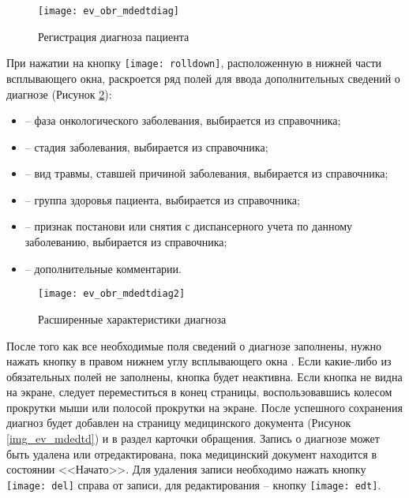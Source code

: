{\begin{enumerate}
  \begin{figure}[ht!]\centering
    \texttt{[image: ev\_obr\_mdedtdiag]}
    \caption{Регистрация диагноза пациента}
    \label{img_ev_obr_mdedtdiag}
  \end{figure}
  
 При нажатии на кнопку \texttt{[image: rolldown]}, расположенную в нижней части всплывающего окна, раскроется ряд полей для ввода дополнительных сведений о диагнозе (Рисунок \ref{img_ev_obr_mdedtdiag2}):
 \begin{itemize}
  \item {} -- фаза онкологического заболевания, выбирается из справочника;
  \item {} -- стадия заболевания, выбирается из справочника;
  \item {} -- вид травмы, ставшей причиной заболевания, выбирается из справочника;
  \item {} -- группа здоровья пациента, выбирается из справочника;
  \item {} -- признак постанови или снятия с диспансерного учета по данному заболеванию, выбирается из справочника;
  \item {} -- дополнительные комментарии.
 \end{itemize}
 
   \begin{figure}[ht!]\centering
   	\texttt{[image: ev\_obr\_mdedtdiag2]}
   	\caption{Расширенные характеристики диагноза}
   	\label{img_ev_obr_mdedtdiag2}
   \end{figure}
   
 После того как все необходимые поля сведений о диагнозе заполнены, нужно нажать кнопку  в правом нижнем углу всплывающего окна . Если какие-либо из обязательных полей не заполнены, кнопка будет неактивна. Если кнопка не видна на экране, следует переместиться в конец страницы, воспользовавшись колесом прокрутки мыши или полосой прокрутки на экране. После успешного сохранения диагноз будет добавлен на страницу медицинского документа (Рисунок \ref{img_ev_mdedtd}) и в раздел  карточки обращения. Запись о диагнозе может быть удалена или отредактирована, пока медицинский документ находится в состоянии <<Начато>>. Для удаления записи необходимо нажать кнопку \texttt{[image: del]} справа от записи, для редактирования -- кнопку \texttt{[image: edt]}. 
  

\end{enumerate}}
